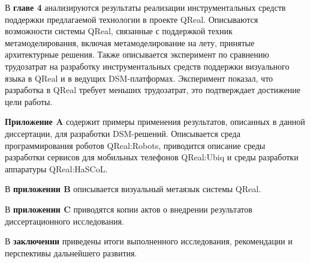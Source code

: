 В \textbf{главе 4} анализируются результаты реализации инструментальных средств поддержки предлагаемой 
технологии в проекте QReal. Описываются возможности системы QReal, связанные с поддержкой 
техник метамоделирования, включая метамоделирование на лету, принятые архитектурные 
решения. Также описывается эксперимент по сравнению трудозатрат на разработку инструментальных
средств поддержки визуального языка в QReal и в ведущих DSM-платформах. Эксперимент 
показал, что разработка в QReal требует меньших трудозатрат, это подтверждает достижение цели работы.

\textbf{Приложение A} содержит примеры применения результатов, описанных в данной 
диссертации, для разработки DSM-решений. Описывается среда программирования роботов 
QReal:Robots, приводится описание среды разработки сервисов для мобильных телефонов 
QReal:Ubiq и среды разработки аппаратуры QReal:HaSCoL.

В \textbf{приложении B} описывается визуальный метаязык системы QReal.

В \textbf{приложении C} приводятся копии актов о внедрении результатов диссертационного исследования.

В \textbf{заключении} приведены итоги выполненного исследования, рекомендации и перспективы дальнейшего развития.

